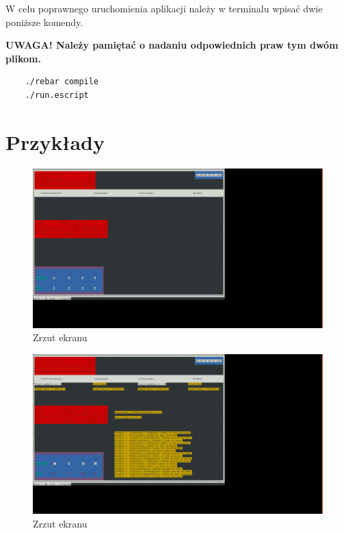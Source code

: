 \documentclass[a4paper,12pt]{article}
\begin{document}
	W celu poprawnego uruchomienia aplikacji należy w terminalu wpisać dwie poniższe komendy.
	
	\textbf{UWAGA! Należy pamiętać o nadaniu odpowiednich praw tym dwóm plikom.}
	
	\begin{lstlisting}
	./rebar compile
	./run.escript
	\end{lstlisting}
	
	\newpage
	\section{Przykłady}
	
	\begin{figure}[!htb]
		\centering
		\includegraphics[width=1.1\linewidth]{terminal1}
		\caption{\label{fig:screen} Zrzut ekranu}
	\end{figure}

	\begin{figure}[!htb]
	\centering
	\includegraphics[width=1.1\linewidth]{terminal2}
	\caption{\label{fig:screen2} Zrzut ekranu}
\end{figure}
	
\end{document}
